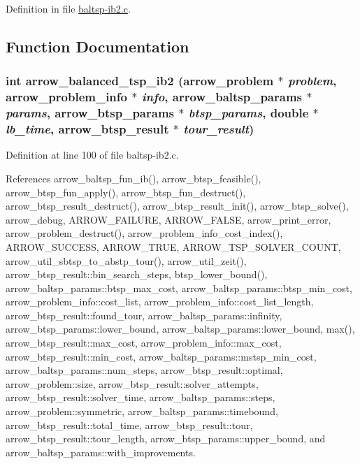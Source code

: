 Definition in file \hyperlink{lib_2baltsp_2baltsp-ib2_8c-source}{baltsp-ib2.c}.

\subsection{Function Documentation}
\hypertarget{lib_2baltsp_2baltsp-ib2_8c_f99b10e444262402df58c126c5818b75}{
\subsubsection[{arrow\_\-balanced\_\-tsp\_\-ib2}]{\setlength{\rightskip}{0pt plus 5cm}int arrow\_\-balanced\_\-tsp\_\-ib2 ({\bf arrow\_\-problem} $\ast$ {\em problem}, \/  {\bf arrow\_\-problem\_\-info} $\ast$ {\em info}, \/  {\bf arrow\_\-baltsp\_\-params} $\ast$ {\em params}, \/  {\bf arrow\_\-btsp\_\-params} $\ast$ {\em btsp\_\-params}, \/  double $\ast$ {\em lb\_\-time}, \/  {\bf arrow\_\-btsp\_\-result} $\ast$ {\em tour\_\-result})}}
\label{lib_2baltsp_2baltsp-ib2_8c_f99b10e444262402df58c126c5818b75}




Definition at line 100 of file baltsp-ib2.c.

References arrow\_\-baltsp\_\-fun\_\-ib(), arrow\_\-btsp\_\-feasible(), arrow\_\-btsp\_\-fun\_\-apply(), arrow\_\-btsp\_\-fun\_\-destruct(), arrow\_\-btsp\_\-result\_\-destruct(), arrow\_\-btsp\_\-result\_\-init(), arrow\_\-btsp\_\-solve(), arrow\_\-debug, ARROW\_\-FAILURE, ARROW\_\-FALSE, arrow\_\-print\_\-error, arrow\_\-problem\_\-destruct(), arrow\_\-problem\_\-info\_\-cost\_\-index(), ARROW\_\-SUCCESS, ARROW\_\-TRUE, ARROW\_\-TSP\_\-SOLVER\_\-COUNT, arrow\_\-util\_\-sbtsp\_\-to\_\-abstp\_\-tour(), arrow\_\-util\_\-zeit(), arrow\_\-btsp\_\-result::bin\_\-search\_\-steps, btsp\_\-lower\_\-bound(), arrow\_\-baltsp\_\-params::btsp\_\-max\_\-cost, arrow\_\-baltsp\_\-params::btsp\_\-min\_\-cost, arrow\_\-problem\_\-info::cost\_\-list, arrow\_\-problem\_\-info::cost\_\-list\_\-length, arrow\_\-btsp\_\-result::found\_\-tour, arrow\_\-baltsp\_\-params::infinity, arrow\_\-btsp\_\-params::lower\_\-bound, arrow\_\-baltsp\_\-params::lower\_\-bound, max(), arrow\_\-btsp\_\-result::max\_\-cost, arrow\_\-problem\_\-info::max\_\-cost, arrow\_\-btsp\_\-result::min\_\-cost, arrow\_\-baltsp\_\-params::mstsp\_\-min\_\-cost, arrow\_\-baltsp\_\-params::num\_\-steps, arrow\_\-btsp\_\-result::optimal, arrow\_\-problem::size, arrow\_\-btsp\_\-result::solver\_\-attempts, arrow\_\-btsp\_\-result::solver\_\-time, arrow\_\-baltsp\_\-params::steps, arrow\_\-problem::symmetric, arrow\_\-baltsp\_\-params::timebound, arrow\_\-btsp\_\-result::total\_\-time, arrow\_\-btsp\_\-result::tour, arrow\_\-btsp\_\-result::tour\_\-length, arrow\_\-btsp\_\-params::upper\_\-bound, and arrow\_\-baltsp\_\-params::with\_\-improvements.

